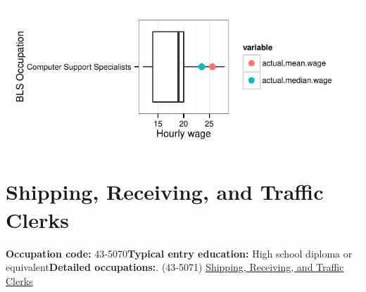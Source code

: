 \documentclass[a4paper,10pt]{article}\usepackage[]{graphicx}\usepackage[]{color}
\makeatletter
\def\maxwidth{ %
  \ifdim\Gin@nat@width>\linewidth
    \linewidth
  \else
    \Gin@nat@width
  \fi
}
\makeatother
\begin{document}
{\centering \includegraphics[width=\maxwidth]{figure/unnamed-chunk-240} 

}


\newpage\section{Shipping, Receiving, and Traffic Clerks}\textbf{Occupation code:} 43-5070\newline\textbf{Typical entry education:} High school diploma or equivalent\newline\textbf{Detailed occupations:}. (43-5071)  \href{http://www.bls.gov/oes/current/oes435071.htm}{Shipping, Receiving, and Traffic Clerks}\newline%
\end{document}
